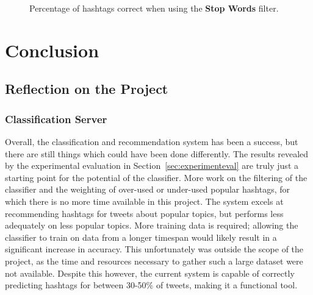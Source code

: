 \documentclass[11pt,a4paper]{report}
\begin{document}
\begin{figure}[htpb]
    \centering
    \caption{Percentage of hashtags correct when using the \textbf{Stop Words} filter.}
    \label{fig:stopgraph}
\end{figure}

\pagebreak

\chapter{Conclusion}
\label{chap:conclusion}

\section{Reflection on the Project}
\label{sec:reflection}
\subsection{Classification Server}
Overall, the classification and recommendation system has been a success, but there are still things which could have been done differently. The results revealed by the experimental evaluation in Section~\ref{sec:experimenteval} are truly just a starting point for the potential of the classifier. More work on the filtering of the classifier and the weighting of over-used or under-used popular hashtags, for which there is no more time available in this project. The system excels at recommending hashtags for tweets about popular topics, but performs less adequately on less popular topics. More training data is required; allowing the classifier to train on data from a longer timespan would likely result in a significant increase in accuracy. This unfortunately was outside the scope of the project, as the time and resources necessary to gather such a large dataset were not available. Despite this however, the current system is capable of correctly predicting hashtags for between 30-50\% of tweets, making it a functional tool.
\end{document}
